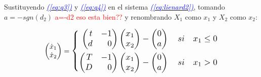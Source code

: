 \documentclass[12pt,a4paper]{report} %
\newcommand{\eref}[1]{\hyperref[#1]{\textcolor{blue}{\textit{(\ref*{#1})}}}}
\begin{document}
	Sustituyendo \eref{eq:q3} y \eref{eq:q4} en el sistema \eref{eq:lienard2}, tomando $a=-sgn(d_2)$ \textcolor{red}{a=-d2 eso esta bien??} y renombrando $X_1$ como $x_1$ y $X_2$ como $x_2$:
	
	
	\begin{equation}
		\begin{pmatrix*}[r]
			\dot{x}_1 \\ \dot{x}_2
		\end{pmatrix*}=
		\label{eq:lienardfinal}
		\scalebox{1.2}{$\displaystyle
			\left\{
			\begin{aligned}
				\begin{pmatrix*}[r]
					t & -1\\
					d & 0
				\end{pmatrix*}\begin{pmatrix*}[r]
					x_1 \\ x_2
				\end{pmatrix*}-\begin{pmatrix}
					0\\a
				\end{pmatrix} \quad si \quad x_1\leq 0 \\
				\begin{pmatrix*}[r]
					T & -1\\
					D & 0
				\end{pmatrix*}\begin{pmatrix*}[r]
					x_1 \\ x_2
				\end{pmatrix*}-\begin{pmatrix}
					0\\a
				\end{pmatrix} \quad si \quad x_1 > 0
			\end{aligned}
			\right. 
			$}
	\end{equation}\smallskip
	
\end{document}

